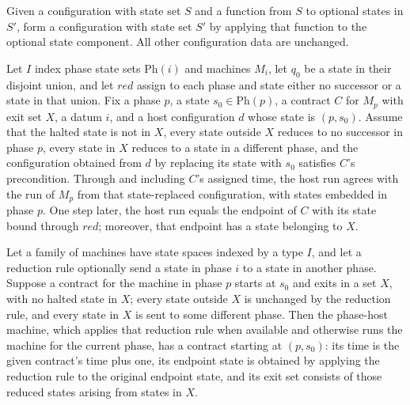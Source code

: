 \begin{definition}
\label{Turing.Cfg.bindState}
\leanok
{}
Given a configuration with state set $S$ and a function from $S$ to optional states in
$S'$, form a configuration with state set $S'$ by applying that function to the optional
state component. All other configuration data are unchanged.
\end{definition}

\begin{lemma}
\label{Turing.Contract.inPhase_traj}
\leanok
{}
Let $I$ index phase state sets $\mathrm{Ph}(i)$ and machines $M_i$, let $q_0$ be a state
in their disjoint union, and let $red$ assign to each phase and state either no
successor or a state in that union. Fix a phase $p$, a state $s_0\in\mathrm{Ph}(p)$, a
contract $C$ for $M_p$ with exit set $X$, a datum $i$, and a host configuration $d$
whose state is $(p,s_0)$. Assume that the halted state is not in $X$, every state
outside $X$ reduces to no successor in phase $p$, every state in $X$ reduces to a state
in a different phase, and the configuration obtained from $d$ by replacing its state
with $s_0$ satisfies $C$'s precondition. Through and including $C$'s assigned time, the
host run agrees with the run of $M_p$ from that state-replaced configuration, with
states embedded in phase $p$. One step later, the host run equals the endpoint of $C$
with its state bound through $red$; moreover, that endpoint has a state belonging to
$X$.
\end{lemma}

\begin{definition}
\label{Turing.Contract.inPhase}
\leanok
{}
Let a family of machines have state spaces indexed by a type $I$, and let a reduction
rule optionally send a state in phase $i$ to a state in another phase. Suppose a
contract for the machine in phase $p$ starts at $s_0$ and exits in a set $X$, with no
halted state in $X$; every state outside $X$ is unchanged by the reduction rule, and
every state in $X$ is sent to some different phase. Then the phase-host machine, which
applies that reduction rule when available and otherwise runs the machine for the
current phase, has a contract starting at $(p,s_0)$: its time is the given contract's
time plus one, its endpoint state is obtained by applying the reduction rule to the
original endpoint state, and its exit set consists of those reduced states arising from
states in $X$.
\end{definition}

